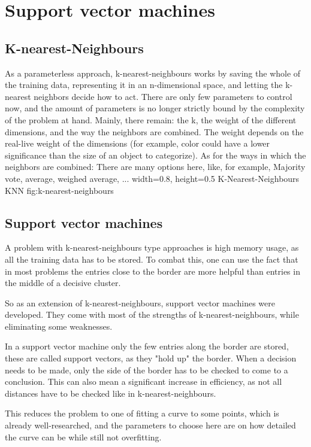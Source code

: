 \section{Support vector machines}
\label{sec:SVM}
\subsection{K-nearest-Neighbours}
As a parameterless approach, k-nearest-neighbours works by saving the whole of the training data, representing it in an n-dimensional space, and letting the k-nearest neighbors decide how to act. There are only few parameters to control now, and the amount of parameters is no longer strictly bound by the complexity of the problem at hand. Mainly, there remain: the k, the weight of the different dimensions, and the way the neighbors are combined. 
The weight depends on the real-live weight of the dimensions (for example, color could have a lower significance than the size of an object to categorize).
As for the ways in which the neighbors are combined: There are many options here, like, for example, Majority vote, average, weighed average, ...
    {width=0.8\textwidth, height=0.5\textheight} %
    {K-Nearest-Neighbours}   %
    {KNN}   %
    {fig:k-nearest-neighbours}    %

\subsection{Support vector machines}
A problem with k-nearest-neighbours type approaches is high memory usage, as all the training data has to be stored. To combat this, one can use the fact that in most problems the entries close to the border are more helpful than entries in the middle of a decisive cluster.

So as an extension of k-nearest-neighbours, support vector machines were developed. They come with most of the strengths of k-nearest-neighbours, while eliminating some weaknesses.

In a support vector machine only the few entries along the border are stored, these are called support vectors, as they "hold up" the border. When a decision needs to be made, only the side of the border has to be checked to come to a conclusion. This can also mean a significant increase in efficiency, as not all distances have to be checked like in k-nearest-neighbours.

This reduces the problem to one of fitting a curve to some points, which is already well-researched, and the parameters to choose here are on how detailed the curve can be while still not overfitting.


